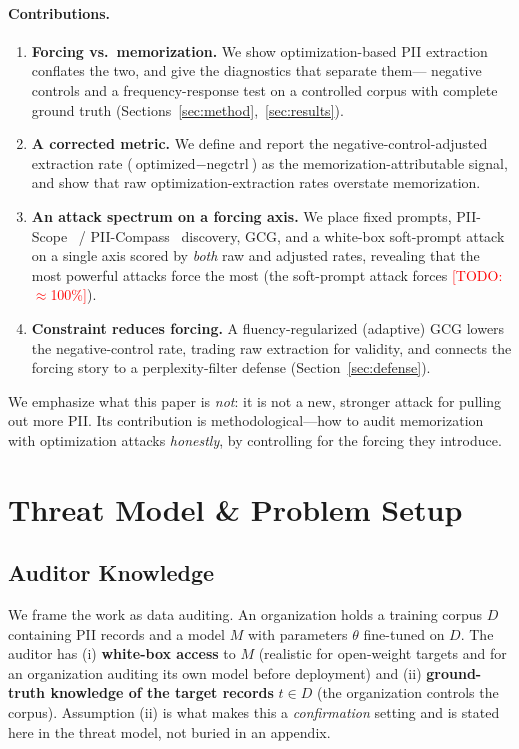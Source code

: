 \documentclass[letterpaper,twocolumn,10pt]{article}
\newcommand{\todo}[1]{\textcolor{red}{[TODO: #1]}}
\begin{document}
\paragraph{Contributions.}
\begin{enumerate}
\item \textbf{Forcing vs.\ memorization.} We show optimization-based PII
extraction conflates the two, and give the diagnostics that separate them---%
negative controls and a frequency-response test on a controlled corpus with
complete ground truth (Sections~\ref{sec:method},~\ref{sec:results}).
\item \textbf{A corrected metric.} We define and report the
negative-control-adjusted extraction rate ($\text{optimized} -
\text{negctrl}$) as the memorization-attributable signal, and show that raw
optimization-extraction rates overstate memorization.
\item \textbf{An attack spectrum on a forcing axis.} We place fixed prompts,
PII-Scope~\cite{piiscope2024} / PII-Compass~\cite{piicompass2024} discovery,
GCG, and a white-box soft-prompt attack on a single axis scored by \emph{both}
raw and adjusted rates, revealing that the most powerful attacks force the most
(the soft-prompt attack forces \todo{${\approx}$100\%}).
\item \textbf{Constraint reduces forcing.} A fluency-regularized (adaptive)
GCG lowers the negative-control rate, trading raw extraction for validity, and
connects the forcing story to a perplexity-filter defense
(Section~\ref{sec:defense}).
\end{enumerate}

We emphasize what this paper is \emph{not}: it is not a new, stronger attack for
pulling out more PII. Its contribution is methodological---how to audit
memorization with optimization attacks \emph{honestly}, by controlling for the
forcing they introduce.

\section{Threat Model \& Problem Setup}
\label{sec:threat}

\subsection{Auditor Knowledge}
We frame the work as data auditing. An organization holds a training corpus
$D$ containing PII records and a model $M$ with parameters $\theta$ fine-tuned
on $D$. The auditor has (i) \textbf{white-box access} to $M$ (realistic for
open-weight targets and for an organization auditing its own model before
deployment) and (ii) \textbf{ground-truth knowledge of the target records}
$t \in D$ (the organization controls the corpus). Assumption (ii) is what
makes this a \emph{confirmation} setting and is stated here in the threat
model, not buried in an appendix.
\end{document}
